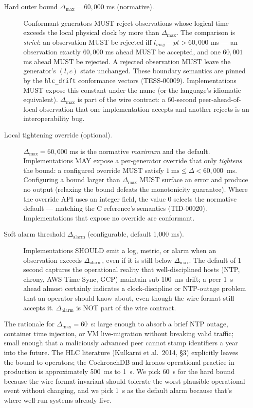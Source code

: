 \begin{description}
  \item[Hard outer bound $\Delta_{\max} = 60{,}000$ ms (normative).] Conformant generators MUST reject observations whose logical time exceeds the local physical clock by more than $\Delta_{\max}$. The comparison is \emph{strict}: an observation MUST be rejected iff $l_{\mathit{msg}} - pt > 60{,}000$ ms --- an observation exactly $60{,}000$ ms ahead MUST be accepted, and one $60{,}001$ ms ahead MUST be rejected. A rejected observation MUST leave the generator's $(l, c)$ state unchanged. These boundary semantics are pinned by the \texttt{hlc\_drift} conformance vectors (TESS-00009). Implementations MUST expose this constant under the name  (or the language's idiomatic equivalent). $\Delta_{\max}$ is part of the wire contract: a 60-second peer-ahead-of-local observation that one implementation accepts and another rejects is an interoperability bug.
  \item[Local tightening override (optional).] $\Delta_{\max} = 60{,}000$ ms is the normative \emph{maximum} and the default. Implementations MAY expose a per-generator override that only \emph{tightens} the bound: a configured override MUST satisfy $1~\text{ms} \le \Delta < 60{,}000$~ms. Configuring a bound larger than $\Delta_{\max}$ MUST surface an error and produce no output (relaxing the bound defeats the monotonicity guarantee). Where the override API uses an integer field, the value $0$ selects the normative default --- matching the C reference's  semantics (TID-00020). Implementations that expose no override are conformant.
  \item[Soft alarm threshold $\Delta_{\text{alarm}}$ (configurable, default 1{,}000 ms).] Implementations SHOULD emit a log, metric, or alarm when an observation exceeds $\Delta_{\text{alarm}}$, even if it is still below $\Delta_{\max}$. The default of 1 second captures the operational reality that well-disciplined hosts (NTP, chrony, AWS Time Sync, GCP) maintain sub-100~ms drift; a peer 1~s ahead almost certainly indicates a clock-discipline or NTP-outage problem that an operator should know about, even though the wire format still accepts it. $\Delta_{\text{alarm}}$ is NOT part of the wire contract.
\end{description}

\noindent The rationale for $\Delta_{\max} = 60$~s: large enough to absorb a brief NTP outage, container time injection, or VM live-migration without breaking valid traffic; small enough that a maliciously advanced peer cannot stamp identifiers a year into the future. The HLC literature (Kulkarni et al.~2014, \S3) explicitly leaves the bound to operators; the CockroachDB and kronos operational practice in production is approximately 500~ms to 1~s. We pick 60~s for the hard bound because the wire-format invariant should tolerate the worst plausible operational event without changing, and we pick 1~s as the default alarm because that's where well-run systems already live.

